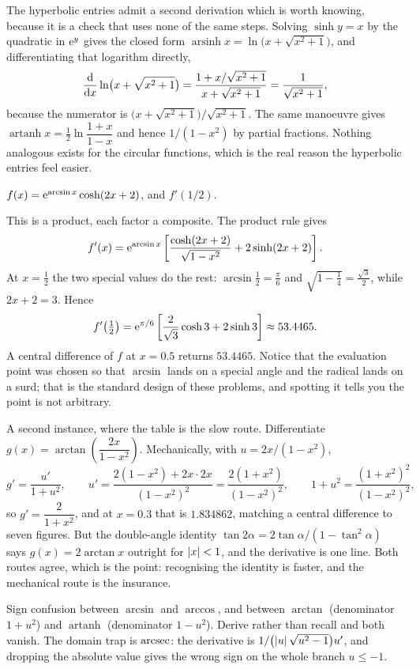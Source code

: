 The hyperbolic entries admit a second derivation which is worth knowing, because it is a check that uses none of the same steps. Solving $\sinh y=x$ by the quadratic in $\mathrm{e}^{y}$ gives the closed form $\operatorname{arsinh}x=\ln\bigl(x+\sqrt{x^{2}+1}\bigr)$, and differentiating that logarithm directly,
\[
\frac{\mathrm{d}}{\mathrm{d}x}\ln\bigl(x+\sqrt{x^{2}+1}\bigr)=\frac{1+x/\sqrt{x^{2}+1}}{x+\sqrt{x^{2}+1}}=\frac{1}{\sqrt{x^{2}+1}},
\]
because the numerator is $\bigl(x+\sqrt{x^{2}+1}\bigr)\big/\sqrt{x^{2}+1}$. The same manoeuvre gives $\operatorname{artanh}x=\tfrac12\ln\dfrac{1+x}{1-x}$ and hence $1/(1-x^{2})$ by partial fractions. Nothing analogous exists for the circular functions, which is the real reason the hyperbolic entries feel easier.

\begin{worked}
$f(x)=\mathrm{e}^{\arcsin x}\cosh(2x+2)$, and $f'(1/2)$.

This is a product, each factor a composite. The product rule gives
\[
f'(x)=\mathrm{e}^{\arcsin x}\left[\frac{\cosh(2x+2)}{\sqrt{1-x^{2}}}+2\sinh(2x+2)\right].
\]
At $x=\tfrac12$ the two special values do the rest: $\arcsin\tfrac12=\tfrac{\pi}{6}$ and $\sqrt{1-\tfrac14}=\tfrac{\sqrt3}{2}$, while $2x+2=3$. Hence
\[
f'\bigl(\tfrac12\bigr)=\mathrm{e}^{\pi/6}\left[\frac{2}{\sqrt3}\cosh3+2\sinh3\right]\approx53.4465 .
\]
A central difference of $f$ at $x=0.5$ returns $53.4465$. Notice that the evaluation point was chosen so that $\arcsin$ lands on a special angle and the radical lands on a surd; that is the standard design of these problems, and spotting it tells you the point is not arbitrary.

A second instance, where the table is the slow route. Differentiate $g(x)=\arctan\!\left(\dfrac{2x}{1-x^{2}}\right)$. Mechanically, with $u=2x/(1-x^{2})$,
\[
g'=\frac{u'}{1+u^{2}},\qquad u'=\frac{2(1-x^{2})+2x\cdot2x}{(1-x^{2})^{2}}=\frac{2(1+x^{2})}{(1-x^{2})^{2}},\qquad 1+u^{2}=\frac{(1+x^{2})^{2}}{(1-x^{2})^{2}},
\]
so $g'=\dfrac{2}{1+x^{2}}$, and at $x=0.3$ that is $1.834862$, matching a central difference to seven figures. But the double-angle identity $\tan2\alpha=2\tan\alpha/(1-\tan^{2}\alpha)$ says $g(x)=2\arctan x$ outright for $\left\lvert x\right\rvert<1$, and the derivative is one line. Both routes agree, which is the point: recognising the identity is faster, and the mechanical route is the insurance.
\end{worked}

\begin{trap}
Sign confusion between $\arcsin$ and $\arccos$, and between $\arctan$ (denominator $1+u^{2}$) and $\operatorname{artanh}$ (denominator $1-u^{2}$). Derive rather than recall and both vanish. The domain trap is $\operatorname{arcsec}$: the derivative is $1/\bigl(\left\lvert u\right\rvert\sqrt{u^{2}-1}\bigr)u'$, and dropping the absolute value gives the wrong sign on the whole branch $u\leq-1$.
\end{trap}

